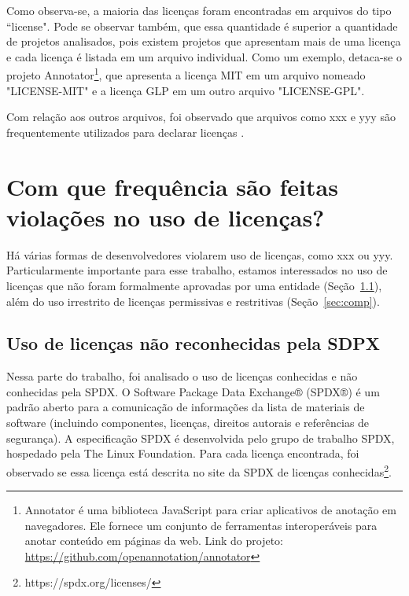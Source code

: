 Como observa-se, a maioria das licenças foram encontradas em arquivos do tipo ``license". Pode se observar também, que essa quantidade é superior a quantidade de projetos analisados, pois existem projetos que apresentam mais de uma licença e cada licença é listada em um arquivo individual. Como um exemplo, detaca-se o projeto Annotator\footnote{Annotator é uma biblioteca JavaScript para criar aplicativos de anotação em navegadores. Ele fornece um conjunto de ferramentas interoperáveis para anotar conteúdo em páginas da web. Link do projeto: \url{https://github.com/openannotation/annotator}}, que apresenta a licença MIT em um arquivo nomeado "LICENSE-MIT" e a licença GLP em um outro arquivo "LICENSE-GPL".

Com relação aos outros arquivos, foi observado que arquivos como xxx e yyy são frequentemente utilizados para declarar licenças .


\section{Com que frequência são feitas violações no uso de licenças?}

Há várias formas de desenvolvedores violarem uso de licenças, como xxx ou yyy. Particularmente importante para esse trabalho, estamos interessados no uso de licenças que não foram formalmente aprovadas por uma entidade (Seção~\ref{sec:spdx}), além do uso irrestrito de licenças permissivas e restritivas (Seção~\ref{sec:comp}).


\subsection{Uso de licenças não reconhecidas pela SDPX}\label{sec:spdx}

Nessa parte do trabalho, foi analisado o uso de licenças conhecidas e não conhecidas pela SPDX. O Software Package Data Exchange® (SPDX®) é um padrão aberto para a comunicação de informações da lista de materiais de software (incluindo componentes, licenças, direitos autorais e referências de segurança). A especificação SPDX é desenvolvida pelo grupo de trabalho SPDX, hospedado pela The Linux Foundation. Para cada licença encontrada, foi observado se essa licença está descrita no site da SPDX de licenças conhecidas\footnote{https://spdx.org/licenses/}.

